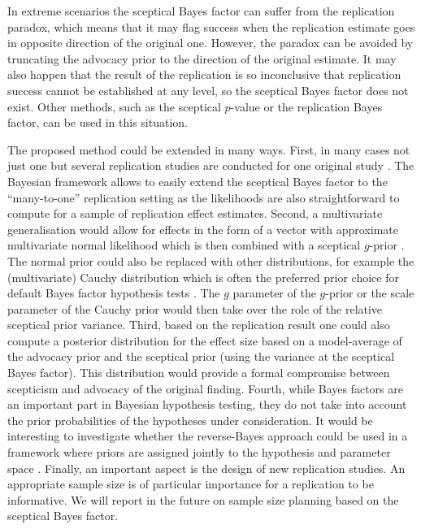 In extreme scenarios the sceptical Bayes factor can suffer from the replication
paradox, which means that it may flag success when the replication estimate goes
in opposite direction of the original one. However, the paradox can be avoided
by truncating the advocacy prior to the direction of the original estimate. It
may also happen that the result of the replication is so inconclusive that
replication success cannot be established at any level, so the sceptical Bayes
factor does not exist. Other methods, such as the sceptical $p$-value or the
replication Bayes factor, can be used in this situation.


The proposed method could be extended in many ways. First, in many cases not
just one but several replication studies are conducted for one original study
\citep[\eg as in][]{Klein2014}. The Bayesian framework allows to easily extend
the sceptical Bayes factor to the ``many-to-one'' replication setting as the
likelihoods are also straightforward to compute for a sample of replication
effect estimates. Second, a multivariate generalisation would allow for effects
in the form of a vector with approximate multivariate normal likelihood which is
then combined with a sceptical $g$-prior \citep{Liang2008}. The normal prior
could also be replaced with other distributions, for example the (multivariate)
Cauchy distribution which is often the preferred prior choice for default Bayes
factor hypothesis tests \citep{Jeffreys1961}. The $g$ parameter of the $g$-prior
or the scale parameter of the Cauchy prior would then take over the role of the
relative sceptical prior variance. Third, based on the replication result one
could also compute a posterior distribution for the effect size based on a
model-average of the advocacy prior and the sceptical prior (using the variance
at the sceptical Bayes factor). This distribution would provide a formal
compromise between scepticism and advocacy of the original finding. Fourth,
while Bayes factors are an important part in Bayesian hypothesis testing, they
do not take into account the prior probabilities of the hypotheses under
consideration. It would be interesting to investigate whether the reverse-Bayes
approach could be used in a framework where priors are assigned jointly to the
hypothesis and parameter space \citep{Dellaportas2012}. Finally, an important
aspect is the design of new replication studies. An appropriate sample size is
of particular importance for a replication to be informative. We will report in
the future on sample size planning based on the sceptical Bayes factor.



